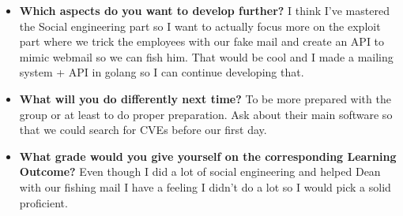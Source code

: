 \documentclass[12pt, letterpaper]{article}
\begin{document}
\begin{itemize}
\item \textbf{Which aspects do you want to develop further?}
\hfill\break
\hfill\break
I think I've mastered the Social engineering part so I want to actually focus more on the exploit part where we trick the employees with our fake mail and create an API to mimic webmail so we can fish him. That would be cool and I made a mailing system + API in golang so I can continue developing that.
\item \textbf{What will you do differently next time?}
\hfill\break
\hfill\break
To be more prepared with the group or at least to do proper preparation. Ask about their main software so that we could search for CVEs before our first day.
\item \textbf{What grade would you give yourself on the corresponding Learning Outcome?}
\hfill\break
Even though I did a lot of social engineering and helped Dean with our fishing mail I have a feeling I didn't do a lot so I would pick a solid proficient.
\end{itemize}

\newpage
\end{document}
